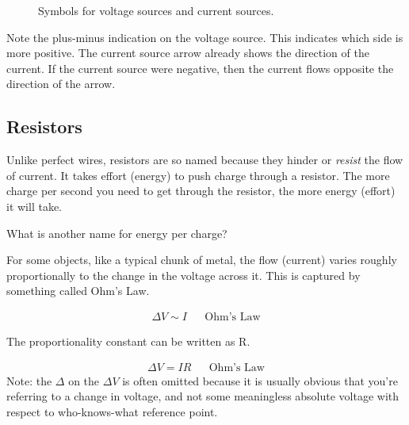 \begin{figure}[H]
\begin{center}
\caption{Symbols for voltage sources and current sources.}
\label{F:2SCV}
\end{center}
\end{figure}

Note the plus-minus indication on the voltage source. This indicates which side is more positive. The current source arrow already shows the direction of the current. If the current source were negative, then the current flows opposite the direction of the arrow.

\subsection{Resistors}
Unlike perfect wires, resistors are so named because they hinder or \emph{resist} the flow of current. It takes effort (energy) to push charge through a resistor. The more charge per second you need to get through the resistor, the more energy (effort) it will take.
\par
\begin{alevel}
What is another name for energy per charge?
\end{alevel}

For some objects, like a typical chunk of metal, the flow (current) varies roughly proportionally to the change in the voltage across it. This is captured by something called Ohm's Law.
\par
\begin{align*}
\Delta V \sim I	&&\text{Ohm's Law}
\end{align*}

The proportionality constant can be written as R.\par
\begin{align}
\Delta V = IR	&&\text{Ohm's Law}
\end{align}
 Note: the $\Delta$ on the $\Delta V$ is often omitted because it is usually obvious that you're referring to a change in voltage, and not some meaningless absolute voltage with respect to who-knows-what reference point. \par

